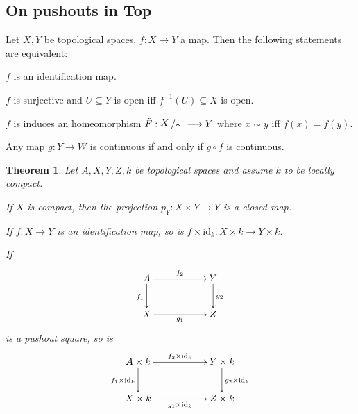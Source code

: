 \documentclass[11pt]{book}
\numberwithin{dummy}{section}
\newtheorem{theorem}{Theorem}[section]
\theoremstyle{nonumberbreak}
\newenvironment{pr}[1][]{\ifthenelse{\equal{#1}{}}{\proof}{\proof[#1]}\rm}{\endproof}
\newenvironment{definbem}[1][]{\ifthenelse{\equal{#1}{}}{\definibem}{\definibem[#1]}\rm}{\enddefinibem}
\newcommand{\la}{\longrightarrow}
\newcommand{\id}{\mathrm{id}}
\newcommand{\slant}[2]{{\raisebox{.1em}{$#1$}\left/\raisebox{-.1em}{$#2$}\right.}}
\begin{document}
\begin{spacing}{1.4}
\section{On pushouts in Top} %




\begin{definbem}
Let $X,Y$ be topological spaces, $f:X \la Y$ a map. Then the following statements are equivalent:
\begin{compactenum}
\item $f$ is an identification map.
\item $f$ is surjective and $U \subseteq Y$ is open iff $f^{-1}(U) \subseteq X$ is open.
\item $f$ is induces an homeomorphism $\tilde{F}: \slant{X}{\sim} \la Y$ where $x \sim y$ iff $f(x) = f(y)$.
\item Any map $g: Y \la W$ is continuous if and only if $g \circ f$ is continuous.
\end{compactenum}
\end{definbem}



\begin{theorem}
Let $A,X,Y,Z,k$ be topological spaces and assume $k$ to be locally compact.
\begin{compactenum}
\item If $X$ is compact, then the projection $p_Y: X \times Y \la Y$ is a closed map.
\item If $f: X \la Y$ is an identification map, so is $f \times \id_k: X \times k \la Y \times k$.
\item If
$$
\begin{xy}
\xymatrix{A \ar[rr]^{f_2} \ar[d]_{f_1} && Y \ar[d]^{g_2} \\ X \ar[rr]_{g_1} && Z
}
\end{xy}
$$ 
is a pushout square, so is
$$
\begin{xy}
\xymatrix{
A \times k \ar[rr]^{f_2 \times \id_k} \ar[d]_{f_1\times \id_k} && Y\times k \ar[d]^{g_2\times \id_k} \\ X\times k \ar[rr]_{g_1 \times \id_k} && Z \times k
}
\end{xy}
$$
\end{compactenum}

\begin{pr}


\end{pr}
\end{theorem}
\end{spacing}
\end{document}
